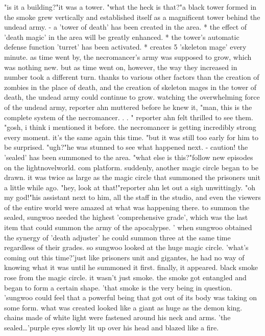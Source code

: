 "is it a building?"it was a tower.
 "what the heck is that?"a black tower formed in the smoke grew vertically and established itself as a magnificent tower behind the undead army.
 - a 'tower of death' has been created in the area.
* the effect of 'death magic' in the area will be greatly enhanced.
* the tower's automatic defense function 'turret' has been activated.
* creates 5 'skeleton mage' every minute.
as time went by, the necromancer's army was supposed to grow, which was nothing new.
 but as time went on, however, the way they increased in number took a different turn.
 thanks to various other factors than the creation of zombies in the place of death, and the creation of skeleton mages in the tower of death, the undead army could continue to grow.
 watching the overwhelming force of the undead army, reporter ahn muttered before he knew it, "man, this is the complete system of the necromancer.
.
.
"
reporter ahn felt thrilled to see them.
 "gosh, i think i mentioned it before.
 the necromancer is getting incredibly strong every moment.
 it's the same again this time.
"but it was still too early for him to be surprised.
"ugh?"he was stunned to see what happened next.
- caution! the 'sealed' has been summoned to the area.
"what else is this?"follow new episodes on the lightnovelworld.
com platform.
suddenly, another magic circle began to be drawn.
 it was twice as large as the magic circle that summoned the prisoners unit a little while ago.
"hey, look at that!"reporter ahn let out a sigh unwittingly.
"oh my god!"his assistant next to him, all the staff in the studio, and even the viewers of the entire world were amazed at what was happening there.
to summon the sealed, sungwoo needed the highest 'comprehensive grade', which was the last item that could summon the army of the apocalypse.
' when sungwoo obtained the synergy of 'death adjuster' he could summon three at the same time regardless of their grades.
so sungwoo looked at the huge magic circle.
'what's coming out this time?'just like prisoners unit and gigantes, he had no way of knowing what it was until he summoned it first.
 finally, it appeared.
black smoke rose from the magic circle.
 it wasn't just smoke.
 the smoke got entangled and began to form a certain shape.
'that smoke is the very being in question.
'sungwoo could feel that a powerful being that got out of its body was taking on some form.
 what was created looked like a giant as huge as the demon king.
 chains made of white light were fastened around his neck and arms.
'the sealed…'purple eyes slowly lit up over his head and blazed like a fire.
